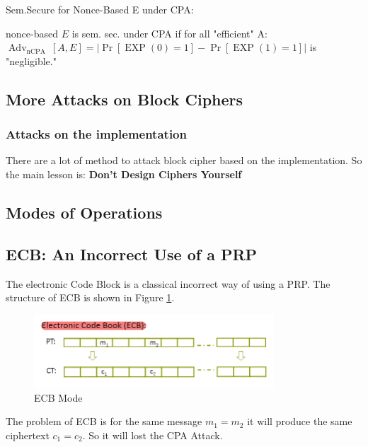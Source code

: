 \begin{definition}  Sem.Secure for Nonce-Based E under CPA:

    nonce-based $E$ is sem. sec. under CPA if for all "efficient" A:
    $\operatorname{Adv}_{\text {nCPA }}[A, E]=|\operatorname{Pr}[\operatorname{EXP}(0)=1]-\operatorname{Pr}[\operatorname{EXP}(1)=1]|$ is "negligible."
    
\end{definition}


\subsection{More Attacks on Block Ciphers}


\subsubsection{Attacks on the implementation}

There  are a lot of method to attack block cipher based on the implementation. So the main lesson is: \textbf{Don't Design Ciphers Yourself}



\subsection{Modes of Operations}

\subsection{ECB: An Incorrect Use of a PRP}


The electronic Code Block is a classical incorrect way of using a PRP. The structure of ECB is shown in Figure \ref{fig: 03 ECB Mode}.


\begin{figure}[h]
    \centering
    \includegraphics[width=0.8\textwidth]{Stanford_Crypto_1/fig/03_block_cipher/ECB Mode.png}
    \caption{ECB Mode}
    \label{fig: 03 ECB Mode}
\end{figure}


The problem of ECB is for the same message $m_1=m_2$ it will produce the same ciphertext $c_1=c_2$. So it will lost the CPA Attack.



